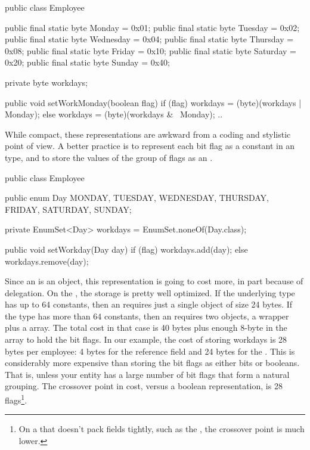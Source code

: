 \begin{shortlisting}
	public class Employee {
	
		public final static byte Monday = 0x01;
		public final static byte Tuesday = 0x02;
		public final static byte Wednesday = 0x04;
		public final static byte Thursday = 0x08;
		public final static byte Friday = 0x10;
		public final static byte Saturday = 0x20;
		public final static byte Sunday = 0x40;
		
		private byte workdays;
		
		public void setWorkMonday(boolean flag) {
			if (flag) {
				workdays = (byte)(workdays | Monday);
			} else {
				workdays = (byte)(workdays & ~Monday);
			}
		}
		..
   }
		       
\end{shortlisting}

While compact, these representations are awkward from a coding and
stylistic point of view. A better practice is to represent each bit flag
as a constant in an  type, and to store the values of the group
of flags as an .

\begin{shortlisting}

    public class Employee {
 
		public enum Day {MONDAY, TUESDAY, WEDNESDAY, THURSDAY, FRIDAY, SATURDAY, SUNDAY};
    	
    	private EnumSet<Day> workdays = EnumSet.noneOf(Day.class);
    
   	 	public void setWorkday(Day day) {
			if (flag) {
				workdays.add(day);
			} else {
				workdays.remove(day);
			}
		}
	}
    
    
\end{shortlisting}

Since an  is an object, this representation is going to
cost more, in part because of delegation. On the \oracle \jre, the
storage is pretty well optimized. If the underlying  type has up to 64 constants,
then an  requires just a single object of size 24 bytes. If
the  type has more than 64 constants, then an  requires
two objects, a wrapper plus a  array. The total cost in that case
is 40 bytes plus enough 8-byte  in the array to hold the bit flags. 
In our example, the cost of storing workdays is 28 bytes per employee:
4 bytes for the reference field and 24 bytes for the . 
This is considerably more expensive than storing the bit flags as either bits or
booleans. That is, unless your entity has a large number of bit flags
that form a natural grouping. The crossover point in cost, versus a boolean
representation, is 28 flags\footnote{On a \jre that doesn't pack 
fields tightly, such as the \ibm \jre, the crossover point is much lower.}.

